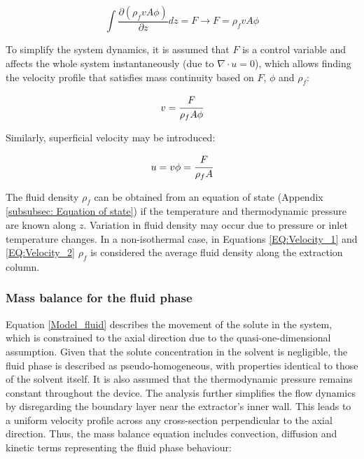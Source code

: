 \documentclass[a4paper,fleqn]{cas-dc}
\begin{document}
{\footnotesize
	\begin{equation}
		\int \frac{\partial (\rho_f v A \phi )}{\partial z} dz = F \rightarrow F=\rho_f v A\phi
	\end{equation}
}

To simplify the system dynamics, it is assumed that $F$ is a control variable and affects the whole system instantaneously (due to $\nabla \cdot u = 0$), which allows finding the velocity profile that satisfies mass continuity based on $F$, $\phi$ and $\rho_f$:

{\footnotesize
	\begin{equation} \label{EQ:Velocity_1}
		v = \cfrac{F}{\rho_f A\phi} 
	\end{equation}
}

Similarly, superficial velocity may be introduced:

{\footnotesize
	\begin{equation} \label{EQ:Velocity_2}
		u = v \phi = \cfrac{F}{\rho_f A }
	\end{equation}
}

The fluid density $\rho_f$ can be obtained from an equation of state (Appendix \ref{subsubsec: Equation of state}) if the temperature and thermodynamic pressure are known along $z$. Variation in fluid density may occur due to pressure or inlet temperature changes. In a non-isothermal case, in Equations \ref{EQ:Velocity_1} and \ref{EQ:Velocity_2} $\rho_f$ is considered the average fluid density along the extraction column.

\subsubsection{Mass balance for the fluid phase} \label{CH: Mass_balance_fluid}

Equation \ref{Model_fluid} describes the movement of the solute in the system, which is constrained to the axial direction due to the quasi-one-dimensional assumption. Given that the solute concentration in the solvent is negligible, the fluid phase is described as pseudo-homogeneous, with properties identical to those of the solvent itself. It is also assumed that the thermodynamic pressure remains constant throughout the device. The analysis further simplifies the flow dynamics by disregarding the boundary layer near the extractor's inner wall. This leads to a uniform velocity profile across any cross-section perpendicular to the axial direction. Thus, the mass balance equation includes convection, diffusion and kinetic terms representing the fluid phase behaviour:
\end{document}
